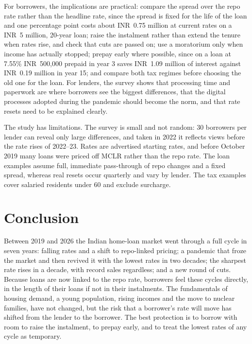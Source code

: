 \documentclass[sn-basic]{sn-jnl}
\newcommand{\INR}{INR~}
\begin{document}
For borrowers, the implications are practical: compare the spread over the repo rate rather than the headline rate, since the spread is fixed for the life of the loan and one percentage point costs about \INR 0.75 million at current rates on a \INR 5 million, 20-year loan; raise the instalment rather than extend the tenure when rates rise, and check that cuts are passed on; use a moratorium only when income has actually stopped; prepay early where possible, since on a loan at 7.55\% \INR 500,000 prepaid in year 3 saves \INR 1.09 million of interest against \INR 0.19 million in year 15; and compare both tax regimes before choosing the old one for the loan. For lenders, the survey shows that processing time and paperwork are where borrowers see the biggest differences, that the digital processes adopted during the pandemic should become the norm, and that rate resets need to be explained clearly.

The study has limitations. The survey is small and not random: 30 borrowers per lender can reveal only large differences, and taken in 2022 it reflects views before the rate rises of 2022--23. Rates are advertised starting rates, and before October 2019 many loans were priced off MCLR rather than the repo rate. The loan examples assume full, immediate pass-through of repo changes and a fixed spread, whereas real resets occur quarterly and vary by lender. The tax examples cover salaried residents under 60 and exclude surcharge.

\section{Conclusion}\label{sec:conclusion}

Between 2019 and 2026 the Indian home-loan market went through a full cycle in seven years: falling rates and a shift to repo-linked pricing; a pandemic that froze the market and then revived it with the lowest rates in two decades; the sharpest rate rises in a decade, with record sales regardless; and a new round of cuts. Because loans are now linked to the repo rate, borrowers feel these cycles directly, in the length of their loans if not in their instalments. The fundamentals of housing demand, a young population, rising incomes and the move to nuclear families, have not changed, but the risk that a borrower's rate will move has shifted from the lender to the borrower. The best protection is to borrow with room to raise the instalment, to prepay early, and to treat the lowest rates of any cycle as temporary.
\end{document}
